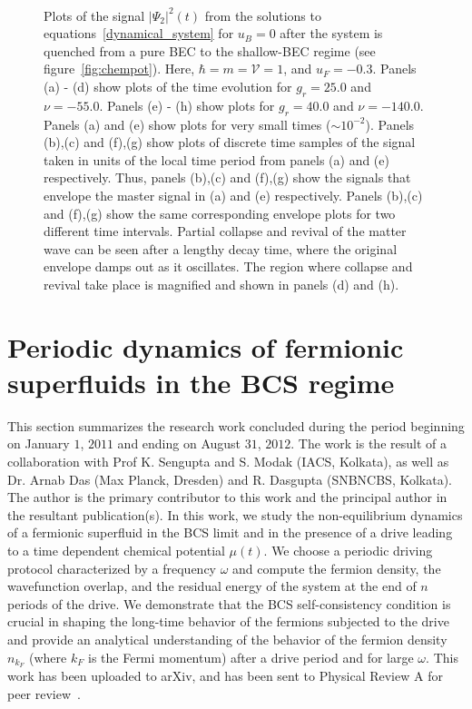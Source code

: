\documentclass[a4paper,10pt]{report}
\begin{document}
\begin{figure}[h!bt]
\ 
\caption{Plots of the signal $|\Psi_2|^2(t)$  from the solutions to equations~\ref{dynamical_system} for $u_B = 0$ after the system is quenched from a pure BEC to the shallow-BEC regime (see figure~\ref{fig:chempot}). Here, $\hbar = m =\mathcal{V} = 1$, and $u_F = -0.3$. Panels (a) - (d) show plots of the time evolution for $g_r=25.0$ and $\nu = -55.0$. Panels (e) - (h) show plots for $g_r=40.0$ and $\nu = -140.0$. Panels (a) and (e) show plots for very small times ($\sim 10^{-2}$). Panels (b),(c) and (f),(g) show plots of discrete time samples of the signal taken in units of the local time period from panels (a) and (e) respectively. Thus, panels (b),(c) and (f),(g) show the signals that envelope the master signal in (a) and (e) respectively. Panels (b),(c) and (f),(g) show the same corresponding envelope plots for two different time intervals. Partial collapse and revival of the matter wave can be seen after a lengthy decay time, where the original envelope damps out as it oscillates. The region where 
collapse and revival take place is magnified and shown in panels (d) and (h).}
\label{fig:colrev}
\end{figure}
\section{\sc Periodic dynamics of fermionic superfluids in the BCS regime}
\label{sec:fermidyn}

This section summarizes the research work concluded during the period beginning on January $1$, $2011$ and ending on August $31$, $2012$. The work is the result of a collaboration with Prof K. Sengupta and S. Modak (IACS, Kolkata), as well as Dr. Arnab Das (Max Planck, Dresden) and R. Dasgupta (SNBNCBS, Kolkata). The author is the primary contributor to this work and the principal author in the resultant publication(s). In this work, we study the non-equilibrium dynamics of a fermionic superfluid in the BCS limit and in the presence of a drive leading to a time dependent chemical potential $\mu(t)$. We choose a periodic driving protocol characterized by a frequency $\omega$ and compute the fermion density, the wavefunction overlap, and the residual energy of the system at the end of $n$ periods of the drive. We demonstrate that the BCS self-consistency condition is crucial in shaping the long-time behavior of the fermions subjected to the drive and provide an analytical understanding of the behavior of the 
fermion density $n_{k_F}$ (where $k_F$ is the Fermi momentum) after a drive period and for large $\omega$. This work has been uploaded to arXiv, and has been sent to Physical Review A for peer review~\cite{mypaper2}.
\end{document}
